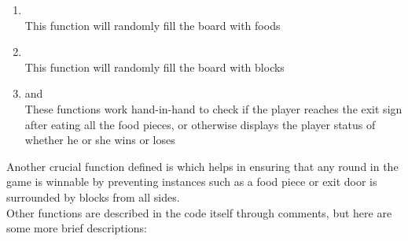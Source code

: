 \begin{enumerate}
    \item {}\\
    \hspace{1em} This function will randomly fill the board with foods
    \item {}\\
    \hspace{1em} This function will randomly fill the board with blocks
    \item {} and \\
    \hspace{1em} These functions work hand-in-hand to check if the player reaches the exit sign after eating all the food pieces,
    or otherwise displays the player status of whether he or she wins or loses
\end{enumerate}

Another crucial function defined is
 which helps in ensuring that any
round in the game is winnable by preventing instances such as a food piece or exit door is surrounded by blocks from all sides.\\

Other functions are described in the code itself through comments, but here are some more brief descriptions:

